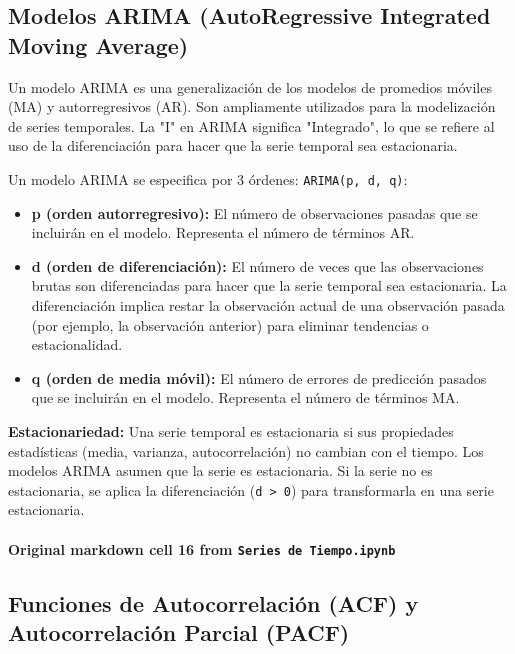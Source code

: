\documentclass[
  11pt,
]{article}
\providecommand{\tightlist}{%
  \setlength{\itemsep}{0pt}\setlength{\parskip}{0pt}}
\begin{document}
\subsection{Modelos ARIMA (AutoRegressive Integrated Moving Average)}\label{modelos-arima-autoregressive-integrated-moving-average}

Un modelo ARIMA es una generalización de los modelos de promedios móviles (MA) y autorregresivos (AR). Son ampliamente utilizados para la modelización de series temporales. La "I" en ARIMA significa "Integrado", lo que se refiere al uso de la diferenciación para hacer que la serie temporal sea estacionaria.

Un modelo ARIMA se especifica por 3 órdenes: \texttt{ARIMA(p,\ d,\ q)}:

\begin{itemize}
\tightlist
\item
  \textbf{p (orden autorregresivo):} El número de observaciones pasadas que se incluirán en el modelo. Representa el número de términos AR.
\item
  \textbf{d (orden de diferenciación):} El número de veces que las observaciones brutas son diferenciadas para hacer que la serie temporal sea estacionaria. La diferenciación implica restar la observación actual de una observación pasada (por ejemplo, la observación anterior) para eliminar tendencias o estacionalidad.
\item
  \textbf{q (orden de media móvil):} El número de errores de predicción pasados que se incluirán en el modelo. Representa el número de términos MA.
\end{itemize}

\textbf{Estacionariedad:} Una serie temporal es estacionaria si sus propiedades estadísticas (media, varianza, autocorrelación) no cambian con el tiempo. Los modelos ARIMA asumen que la serie es estacionaria. Si la serie no es estacionaria, se aplica la diferenciación (\texttt{d\ \textgreater{}\ 0}) para transformarla en una serie estacionaria.

\paragraph{\texorpdfstring{Original markdown cell 16 from \texttt{Series\ de\ Tiempo.ipynb}}{Original markdown cell 16 from Series de Tiempo.ipynb}}\label{original-markdown-cell-16-from-series-de-tiempoipynb}

\subsection{Funciones de Autocorrelación (ACF) y Autocorrelación Parcial (PACF)}\label{funciones-de-autocorrelaciuxf3n-acf-y-autocorrelaciuxf3n-parcial-pacf}
\end{document}
